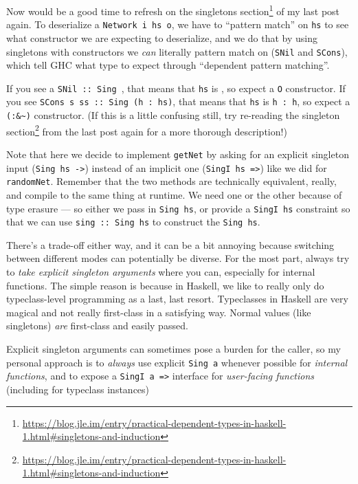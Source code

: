 \documentclass[]{article}
\renewcommand{\href}[2]{#2\footnote{\url{#1}}}
\begin{document}
Now would be a good time to refresh on the
\href{https://blog.jle.im/entry/practical-dependent-types-in-haskell-1.html\#singletons-and-induction}{singletons
section} of my last post again. To deserialize a \texttt{Network\ i\ hs\ o}, we
have to ``pattern match'' on \texttt{hs} to see what constructor we are
expecting to deserialize, and we do that by using singletons with constructors
we \emph{can} literally pattern match on (\texttt{SNil} and \texttt{SCons}),
which tell GHC what type to expect through ``dependent pattern matching''.

If you see a \texttt{SNil\ ::\ Sing\ \textquotesingle{}{[}{]}}, that means that
\texttt{hs} is \texttt{\textquotesingle{}{[}{]}}, so expect a \texttt{O}
constructor. If you see
\texttt{SCons\ s\ ss\ ::\ Sing\ (h\ \textquotesingle{}:\ hs)}, that means that
\texttt{hs} is \texttt{h\ \textquotesingle{}:\ h\textquotesingle{}}, so expect a
\texttt{(:\&\textasciitilde{})} constructor. (If this is a little confusing
still, try re-reading the
\href{https://blog.jle.im/entry/practical-dependent-types-in-haskell-1.html\#singletons-and-induction}{singleton
section} from the last post again for a more thorough description!)

Note that here we decide to implement \texttt{getNet} by asking for an explicit
singleton input (\texttt{Sing\ hs\ -\textgreater{}}) instead of an implicit one
(\texttt{SingI\ hs\ =\textgreater{}}) like we did for \texttt{randomNet}.
Remember that the two methods are technically equivalent, really, and compile to
the same thing at runtime. We need one or the other because of type erasure ---
so either we pass in \texttt{Sing\ hs}, or provide a \texttt{SingI\ hs}
constraint so that we can use \texttt{sing\ ::\ Sing\ hs} to construct the
\texttt{Sing\ hs}.

There's a trade-off either way, and it can be a bit annoying because switching
between different modes can potentially be diverse. For the most part, always
try to \emph{take explicit singleton arguments} where you can, especially for
internal functions. The simple reason is because in Haskell, we like to really
only do typeclass-level programming as a last, last resort. Typeclasses in
Haskell are very magical and not really first-class in a satisfying way. Normal
values (like singletons) \emph{are} first-class and easily passed.

Explicit singleton arguments can sometimes pose a burden for the caller, so my
personal approach is to \emph{always} use explicit \texttt{Sing\ a} whenever
possible for \emph{internal functions}, and to expose a
\texttt{SingI\ a\ =\textgreater{}} interface for \emph{user-facing functions}
(including for typeclass instances)
\end{document}
